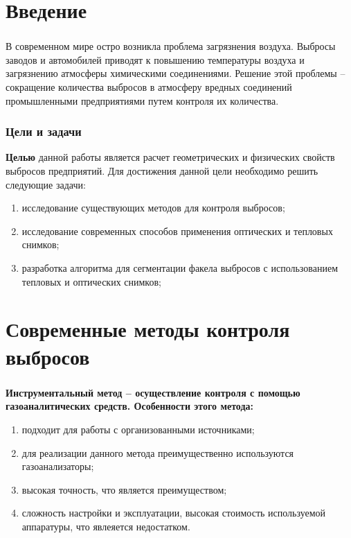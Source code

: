 \documentclass[t]{beamer}
\begin{document}
	
	\firstpage
	\justifying
\section{Введение}

	\begin{frame}
		\frametitle{\insertsection} 
		В современном мире остро возникла проблема загрязнения воздуха. Выбросы заводов и автомобилей приводят к повышению температуры воздуха и загрязнению атмосферы химическими соединениями. Решение этой проблемы -- сокращение количества выбросов в атмосферу вредных соединений промышленными предприятиями путем контроля их количества.
	\end{frame}

	\begin{frame}
		\frametitle{Цели и задачи} 
		\textbf{Целью} данной работы является расчет геометрических и физических свойств выбросов предприятий. Для достижения данной цели необходимо решить следующие задачи:
		\begin{enumerate}
			\justifying
			\item исследование существующих методов для контроля выбросов;
			\item исследование современных способов применения оптических и тепловых снимков;
			\item разработка алгоритма для сегментации факела выбросов с использованием тепловых и оптических снимков;
		\end{enumerate}
	\end{frame}

\section[Современные методы]{Современные методы контроля выбросов}
	\begin{frame}
		\frametitle{\insertsection} 
		\bfseries Инструментальный метод \normalfont -- осуществление контроля с помощью газоаналитических средств. Особенности этого метода:
		\begin{enumerate}
			\justifying
			\item подходит для работы с организованными источниками;
			\item для реализации данного метода преимущественно используются газоанализаторы;
			\item высокая точность, что является преимуществом;
			\item сложность настройки и эксплуатации, высокая стоимость используемой аппаратуры, что явлеяется недостатком.
		\end{enumerate}
	\end{frame}
	
\end{document}
